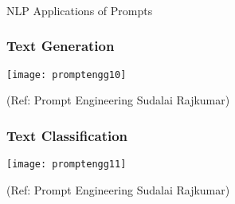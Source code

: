 






\begin{frame}[fragile]\frametitle{}
\begin{center}
{\Large NLP Applications of Prompts}
\end{center}
\end{frame}


\begin{frame}[fragile]\frametitle{Text Generation}

\begin{center}
\texttt{[image: promptengg10]}

{\tiny (Ref: Prompt Engineering Sudalai Rajkumar)}

\end{center}		
		


\end{frame}

\begin{frame}[fragile]\frametitle{Text Classification}

\begin{center}
\texttt{[image: promptengg11]}

{\tiny (Ref: Prompt Engineering Sudalai Rajkumar)}

\end{center}		
		


\end{frame}

